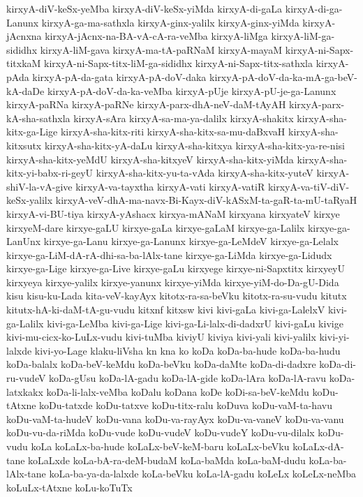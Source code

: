 {kirxyA-diV-keSx-yeMba
kirxyA-diV-keSx-yiMda
kirxyA-di-gaLa
kirxyA-di-ga-Lanunx
kirxyA-ga-ma-sathxla
kirxyA-ginx-yalilx
kirxyA-ginx-yiMda
kirxyA-jAcnxna
kirxyA-jAcnx-na-BA-vA-cA-ra-veMba
kirxyA-liMga
kirxyA-liM-ga-sididhx
kirxyA-liM-gava
kirxyA-ma-tA-paRNaM
kirxyA-mayaM
kirxyA-ni-Sapx-titxkaM
kirxyA-ni-Sapx-titx-liM-ga-sididhx
kirxyA-ni-Sapx-titx-sathxla
kirxyA-pAda
kirxyA-pA-da-gata
kirxyA-pA-doV-daka
kirxyA-pA-doV-da-ka-mA-ga-beV-kA-daDe
kirxyA-pA-doV-da-ka-veMba
kirxyA-pUje
kirxyA-pU-je-ga-Lanunx
kirxyA-paRNa
kirxyA-paRNe
kirxyA-parx-dhA-neV-daM-tAyAH
kirxyA-parx-kA-sha-sathxla
kirxyA-sAra
kirxyA-sa-ma-ya-dalilx
kirxyA-shakitx
kirxyA-sha-kitx-ga-Lige
kirxyA-sha-kitx-riti
kirxyA-sha-kitx-sa-mu-daBxvaH
kirxyA-sha-kitxsutx
kirxyA-sha-kitx-yA-daLu
kirxyA-sha-kitxya
kirxyA-sha-kitx-ya-re-nisi
kirxyA-sha-kitx-yeMdU
kirxyA-sha-kitxyeV
kirxyA-sha-kitx-yiMda
kirxyA-sha-kitx-yi-babx-ri-geyU
kirxyA-sha-kitx-yu-ta-vAda
kirxyA-sha-kitx-yuteV
kirxyA-shiV-la-vA-give
kirxyA-va-tayxtha
kirxyA-vati
kirxyA-vatiR
kirxyA-va-tiV-diV-keSx-yalilx
kirxyA-veV-dhA-ma-navx-Bi-Kayx-diV-kASxM-ta-gaR-ta-mU-taRyaH
kirxyA-vi-BU-tiya
kirxyA-yAshacx
kirxya-mANaM
kirxyana
kirxyateV
kirxye
kirxyeM-dare
kirxye-gaLU
kirxye-gaLa
kirxye-gaLaM
kirxye-ga-Lalilx
kirxye-ga-LanUnx
kirxye-ga-Lanu
kirxye-ga-Lanunx
kirxye-ga-LeMdeV
kirxye-ga-Lelalx
kirxye-ga-LiM-dA-rA-dhi-sa-ba-lAlx-tane
kirxye-ga-LiMda
kirxye-ga-Lidudx
kirxye-ga-Lige
kirxye-ga-Live
kirxye-gaLu
kirxyege
kirxye-ni-Sapxtitx
kirxyeyU
kirxyeya
kirxye-yalilx
kirxye-yanunx
kirxye-yiMda
kirxye-yiM-do-Da-gU-Dida
kisu
kisu-ku-Lada
kita-veV-kayAyx
kitotx-ra-sa-beVku
kitotx-ra-su-vudu
kitutx
kitutx-hA-ki-daM-tA-gu-vudu
kitxnf
kitxsw
kivi
kivi-gaLa
kivi-ga-LalelxV
kivi-ga-Lalilx
kivi-ga-LeMba
kivi-ga-Lige
kivi-ga-Li-lalx-di-dadxrU
kivi-gaLu
kivige
kivi-mu-cicx-ko-LuLx-vudu
kivi-tuMba
kiviyU
kiviya
kivi-yali
kivi-yalilx
kivi-yi-lalxde
kivi-yo-Lage
klaku-liVsha
kn
kna
ko
koDa
koDa-ba-hude
koDa-ba-hudu
koDa-balalx
koDa-beV-keMdu
koDa-beVku
koDa-daMte
koDa-di-dadxre
koDa-di-ru-vudeV
koDa-gUsu
koDa-lA-gadu
koDa-lA-gide
koDa-lAra
koDa-lA-ravu
koDa-latxkakx
koDa-li-lalx-veMba
koDalu
koDana
koDe
koDi-sa-beV-keMdu
koDu-tAtxne
koDu-tatxde
koDu-tatxve
koDu-titx-ralu
koDuva
koDu-vaM-ta-havu
koDu-vaM-ta-hudeV
koDu-vana
koDu-va-rayAyx
koDu-va-vaneV
koDu-va-vanu
koDu-vu-da-riMda
koDu-vude
koDu-vudeV
koDu-vudeY
koDu-vu-dilalx
koDu-vudu
koLa
koLaLx-ba-hude
koLaLx-beV-keM-baru
koLaLx-beVku
koLaLx-dA-tane
koLaLxde
koLa-bA-ra-deM-budaM
koLa-baMda
koLa-baM-dudu
koLa-ba-lAlx-tane
koLa-ba-ya-da-lalxde
koLa-beVku
koLa-lA-gadu
koLeLx
koLeLx-neMba
koLuLx-tAtxne
koLu-koTuTx
}
